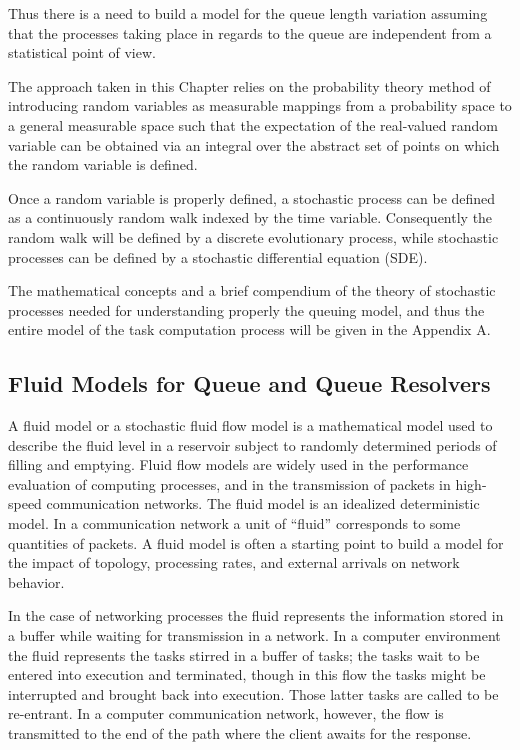Thus there is a need to build a model for the queue length variation assuming that the processes taking place in regards to the queue are independent from a statistical point of view.

The approach taken in this Chapter relies on the probability theory method of introducing random variables as measurable mappings from a probability space to a general measurable space such that the expectation of the real-valued random variable can be obtained via an integral over the abstract set of points on which the random variable is defined.

Once a random variable is properly defined, a stochastic process can be defined as a continuously random walk indexed by the time variable.
Consequently the random walk will be defined by a discrete evolutionary process, while stochastic processes can be defined by a stochastic differential equation (SDE). 

 The mathematical concepts and a brief compendium of the theory of stochastic processes needed for understanding properly the queuing model, and thus the entire model of the task computation process will be given in the Appendix A. 

\subsection{Fluid Models for Queue and Queue Resolvers}

A fluid model or a stochastic fluid flow model is a mathematical model used to describe the fluid level in a reservoir subject to randomly determined periods of filling and emptying. Fluid flow models are widely used in the performance evaluation of computing processes, and in the transmission of packets in high-speed communication networks. The fluid model is an idealized deterministic model. In a communication network a unit of ``fluid'' corresponds to some quantities of packets. A fluid model is often a starting point to build a model for the impact of topology, processing rates, and external arrivals on network behavior.

In the case of networking processes the fluid represents the information stored in a buffer while waiting for transmission in a network. In a computer environment the fluid represents the tasks stirred in a buffer of tasks; the tasks wait to be entered into execution and terminated, though in this flow the tasks might be interrupted and brought back into execution. Those latter tasks are called to  be re-entrant. In a computer communication network, however, the flow is transmitted to the end of the path where the client awaits for the response. 


